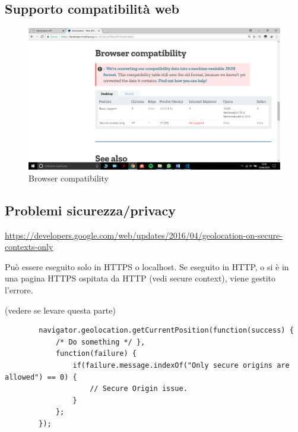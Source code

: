 \documentclass[italian]{article}
\begin{document}
\subsection{Supporto compatibilità web}
\begin{figure}[h]
	\centering
	\includegraphics[width=1\linewidth]{web1}
	\caption{Browser compatibility}
	\label{fig:Browser compatibility}
\end{figure}
	
\subsection{Problemi sicurezza/privacy}
\url{https://developers.google.com/web/updates/2016/04/geolocation-on-secure-contexts-only}

Può essere eseguito solo in HTTPS o localhost. Se eseguito in HTTP, o si è in una pagina HTTPS ospitata da HTTP (vedi secure context), viene gestito l'errore.

(vedere se levare questa parte)
\begin{lstlisting}
		navigator.geolocation.getCurrentPosition(function(success) { 
			/* Do something */ },
			function(failure) {
				if(failure.message.indexOf("Only secure origins are allowed") == 0) {
					// Secure Origin issue.
				}
			};
		});
\end{lstlisting}
	



	
\end{document}
